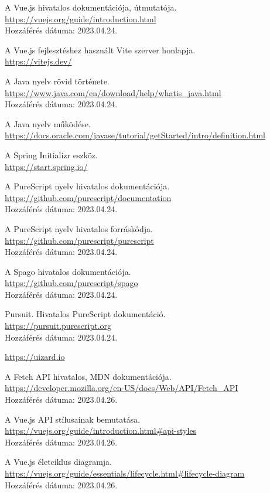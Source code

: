 \documentclass[12pt]{article}
\begin{document}
\begin{thebibliography}{99}
A Vue.js hivatalos dokumentációja, útmutatója. \\ \url{https://vuejs.org/guide/introduction.html} \\Hozzáférés dátuma: 2023.04.24.

A Vue.js fejlesztéshez használt Vite szerver honlapja. \\ \url{https://vitejs.dev/}

A Java nyelv rövid története. \\ \url{https://www.java.com/en/download/help/whatis_java.html} \\Hozzáférés dátuma: 2023.04.24.

A Java nyelv működése. \\ \url{https://docs.oracle.com/javase/tutorial/getStarted/intro/definition.html}

A Spring Initializr eszköz. \\ \url{https://start.spring.io/}

A PureScript nyelv hivatalos dokumentációja.\\
\url{https://github.com/purescript/documentation} \\Hozzáférés dátuma: 2023.04.24.

A PureScript nyelv hivatalos forráskódja.\\
\url{https://github.com/purescript/purescript}\\ Hozzáférés dátuma: 2023.04.24.

A Spago hivatalos dokumentációja.\\
\url{https://github.com/purescript/spago}\\ Hozzáférés dátuma: 2023.04.24.

Pursuit. Hivatalos PureScript dokumentáció.\\
\url{https://pursuit.purescript.org} \\Hozzáférés dátuma: 2023.04.24.

\url{https://uizard.io} 

A Fetch API hivatalos, MDN dokumentációja. \\ \url{https://developer.mozilla.org/en-US/docs/Web/API/Fetch_API}\\ Hozzáférés dátuma: 2023.04.26.

A Vue.js API stílusainak bemutatása. \\ \url{https://vuejs.org/guide/introduction.html#api-styles} \\Hozzáférés dátuma: 2023.04.26.

A Vue.js életciklus diagramja. \\ \url{https://vuejs.org/guide/essentials/lifecycle.html#lifecycle-diagram} \\Hozzáférés dátuma: 2023.04.26.

\end{thebibliography}
\end{document}
